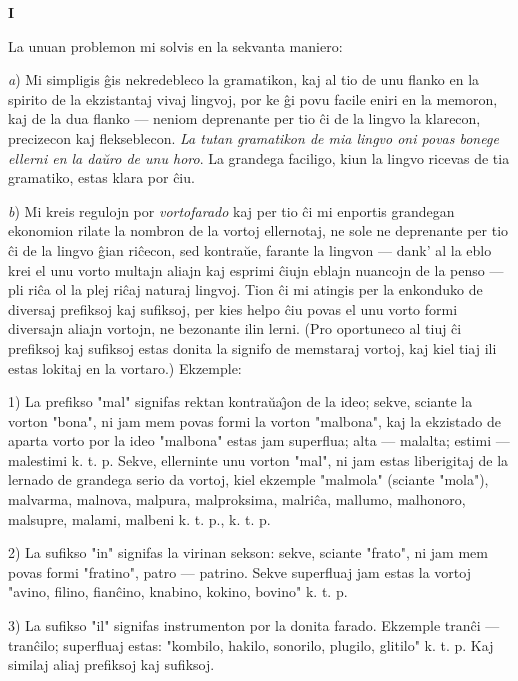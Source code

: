 \begin{center}
\textbf{I}
\end{center}

   La unuan problemon mi solvis en la sekvanta maniero:

   \emph{a}) Mi simpligis \^gis nekredebleco la gramatikon, kaj al tio de unu
flanko en la spirito de la ekzistantaj vivaj lingvoj, por ke \^gi
povu facile eniri en la memoron, kaj de la dua flanko --- neniom
deprenante per tio \^ci de la lingvo la klarecon, precizecon kaj
flekseblecon. {\sl La tutan gramatikon de mia lingvo oni povas
bonege ellerni en la da\u uro de unu horo}. La grandega faciligo,
kiun la lingvo ricevas de tia gramatiko, estas klara por \^ciu.

   \emph{b}) Mi kreis regulojn por {\sl vortofarado} kaj per tio \^ci mi enportis
grandegan ekonomion rilate la nombron de la vortoj ellernotaj, ne
sole ne deprenante per tio \^ci de la lingvo \^gian ri\^cecon, sed
kontra\u ue, farante la lingvon --- dank' al la eblo krei el unu
vorto multajn aliajn kaj esprimi \^ciujn eblajn nuancojn de la penso
--- pli ri\^ca ol la plej ri\^caj naturaj lingvoj. Tion \^ci mi
atingis per la enkonduko de diversaj prefiksoj kaj sufiksoj, per
kies helpo \^ciu povas el unu vorto formi diversajn aliajn vortojn,
ne bezonante ilin lerni. (Pro oportuneco al tiuj \^ci prefiksoj kaj
sufiksoj estas donita la signifo de memstaraj vortoj, kaj kiel tiaj
ili estas lokitaj en la vortaro.) Ekzemple:

   1) La prefikso "mal" signifas rektan kontra\u ua\^{\j}on de la ideo;
sekve, sciante la vorton "bona", ni jam mem povas formi la vorton
"malbona", kaj la ekzistado de aparta vorto por la ideo
"malbona" estas jam superflua; alta --- malalta; estimi ---
malestimi k. t. p. Sekve, ellerninte unu vorton "mal", ni jam
estas liberigitaj de la lernado de grandega serio da vortoj, kiel
ekzemple "malmola" (sciante "mola"), malvarma, malnova, malpura,
malproksima, malri\^ca, mallumo, malhonoro, malsupre, malami,
malbeni k. t. p., k. t. p.

   2) La sufikso "in" signifas la virinan sekson: sekve, sciante
"frato", ni jam mem povas formi "fratino", patro --- patrino.
Sekve superfluaj jam estas la vortoj "avino, filino, fian\^cino,
knabino, kokino, bovino" k. t. p.

   3) La sufikso "il" signifas instrumenton por la donita farado.
Ekzemple tran\^ci --- tran\^cilo; superfluaj estas: "kombilo,
hakilo, sonorilo, plugilo, glitilo" k. t. p. Kaj similaj aliaj
prefiksoj kaj sufiksoj.

